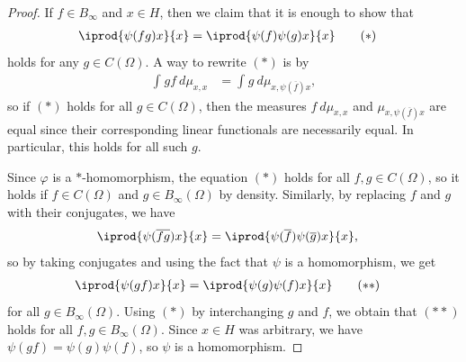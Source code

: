 \documentclass[10pt]{mypackage}
\begin{document}
\begin{proof}
  If $f\in B_{\infty}$ and $x\in H$, then we claim that it is enough to show that
  \begin{align*}
    \iprod{\psi(fg)x}{x} &= \iprod{\psi(f)\psi(g)x}{x}\tag*{$(\ast)$}
  \end{align*}
  holds for any $g\in C(\Omega)$. A way to rewrite $(\ast)$ is by
  \begin{align*}
    \int_{}^{} gf\:d\mu_{x,x} &= \int_{}^{} g\:d\mu_{x,\psi( \overline{f} )x},
  \end{align*}
  so if $(\ast)$ holds for all $g\in C(\Omega)$, then the measures $f\:d\mu_{x,x}$ and $\mu_{x,\psi( \overline{f} )x}$ are equal since their corresponding linear functionals are necessarily equal. In particular, this holds for all such $g$.

  Since $\varphi$ is a $\ast$-homomorphism, the equation $(\ast)$ holds for all $f,g\in C(\Omega)$, so it holds if $f\in C(\Omega)$ and $g\in B_{\infty}(\Omega)$ by density. Similarly, by replacing $f$ and $g$ with their conjugates, we have
  \begin{align*}
    \iprod{\psi( \overline{fg} )x}{x} &= \iprod{\psi( \overline{f} ) \psi( \overline{g} )x}{x},
  \end{align*}
  so by taking conjugates and using the fact that $\psi$ is a homomorphism, we get
  \begin{align*}
    \iprod{\psi(gf)x}{x} &= \iprod{\psi(g)\psi(f)x}{x}\tag*{$(\ast\ast)$}
  \end{align*}
  for all $g\in B_{\infty}(\Omega)$. Using $(\ast)$ by interchanging $g$ and $f$, we obtain that $(\ast\ast)$ holds for all $f,g\in B_{\infty}(\Omega)$. Since $x\in H$ was arbitrary, we have $\psi(gf) = \psi(g)\psi(f)$, so $\psi$ is a homomorphism.


\end{proof}
\end{document}
